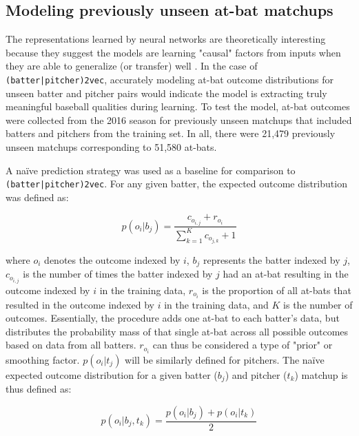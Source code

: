 \documentclass{article}
\begin{document}
\subsection{Modeling previously unseen at-bat matchups}

The representations learned by neural networks are theoretically interesting because they suggest the models are learning "causal" factors from inputs when they are able to generalize (or transfer) well \parencite{RepresentationLearning}. In the case of \texttt{(batter|pitcher)2vec}, accurately modeling at-bat outcome distributions for unseen batter and pitcher pairs would indicate the model is extracting truly meaningful baseball qualities during learning. To test the model, at-bat outcomes were collected from the 2016 season for previously unseen matchups that included batters and pitchers from the training set. In all, there were 21,479 previously unseen matchups corresponding to 51,580 at-bats.

A naïve prediction strategy was used as a baseline for comparison to \texttt{(batter|pitcher)2vec}. For any given batter, the expected outcome distribution was defined as:

\begin{equation}
\label{eqn:batter_naïve}
p(o_i|b_j)=\frac{c_{o_{i,j}} + r_{o_i}}{\sum_{k=1}^{K} c_{o_{j,k}} + 1}
\end{equation}

where $o_i$ denotes the outcome indexed by $i$, $b_j$ represents the batter indexed by $j$, $c_{o_{i,j}}$ is the number of times the batter indexed by $j$ had an at-bat resulting in the outcome indexed by $i$ in the training data, $r_{o_i}$ is the proportion of all at-bats that resulted in the outcome indexed by $i$ in the training data, and $K$ is the number of outcomes. Essentially, the procedure adds one at-bat to each batter's data, but distributes the probability mass of that single at-bat across all possible outcomes based on data from all batters. $r_{o_i}$ can thus be considered a type of "prior" or smoothing factor. $p(o_i|t_j)$ will be similarly defined for pitchers. The naïve expected outcome distribution for a given batter ($b_j$) and pitcher ($t_k$) matchup is thus defined as:

\begin{equation}
\label{eqn:naïve}
p(o_i|b_j,t_k) = \frac{p(o_i|b_j) + p(o_i|t_k)}{2}
\end{equation}
\end{document}
